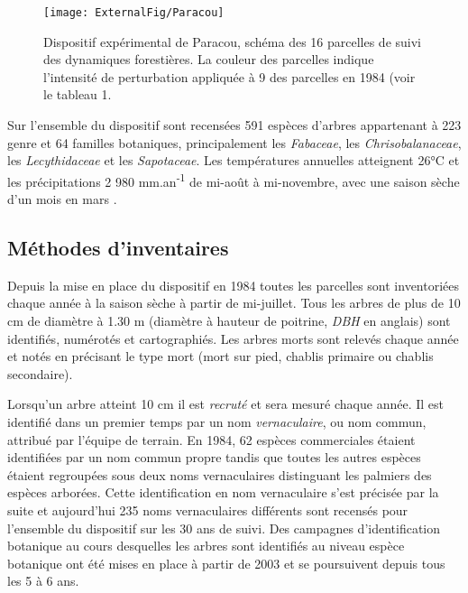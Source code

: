 \documentclass[
  11pt,
  french,
  A4paper,
  extrafontsizes,onecolumn,openright
  ]{memoir}
\begin{document}
\begin{figure}

{\centering \texttt{[image: ExternalFig/Paracou]} 

}

\caption{Dispositif expérimental de Paracou, schéma des 16 parcelles de suivi des dynamiques forestières. La couleur des parcelles indique l'intensité de perturbation appliquée à 9 des parcelles en 1984 (voir le tableau 1.}\label{fig:ParacouDesign}
\end{figure}

Sur l'ensemble du dispositif sont recensées 591 espèces d'arbres
appartenant à 223 genre et 64 familles botaniques, principalement les
\emph{Fabaceae}, les \emph{Chrisobalanaceae}, les \emph{Lecythidaceae}
et les \emph{Sapotaceae}. Les températures annuelles atteignent 26°C et
les précipitations 2 980 mm.an\textsuperscript{-1} de mi-août à
mi-novembre, avec une saison sèche d'un mois en mars
\autocite{Wagner2011}.

\subsection{Méthodes d'inventaires}\label{methodes-dinventaires}

Depuis la mise en place du dispositif en 1984 toutes les parcelles sont
inventoriées chaque année à la saison sèche à partir de mi-juillet. Tous
les arbres de plus de 10 cm de diamètre à 1.30 m (diamètre à hauteur de
poitrine, \emph{DBH} en anglais) sont identifiés, numérotés et
cartographiés. Les arbres morts sont relevés chaque année et notés en
précisant le type mort (mort sur pied, chablis primaire ou chablis
secondaire).

Lorsqu'un arbre atteint 10 cm il est \emph{recruté} et sera mesuré
chaque année. Il est identifié dans un premier temps par un nom
\emph{vernaculaire}, ou nom commun, attribué par l'équipe de terrain. En
1984, 62 espèces commerciales étaient identifiées par un nom commun
propre tandis que toutes les autres espèces étaient regroupées sous deux
noms vernaculaires distinguant les palmiers des espèces arborées. Cette
identification en nom vernaculaire s'est précisée par la suite et
aujourd'hui 235 noms vernaculaires différents sont recensés pour
l'ensemble du dispositif sur les 30 ans de suivi. Des campagnes
d'identification botanique au cours desquelles les arbres sont
identifiés au niveau espèce botanique ont été mises en place à partir de
2003 et se poursuivent depuis tous les 5 à 6 ans.
\end{document}
